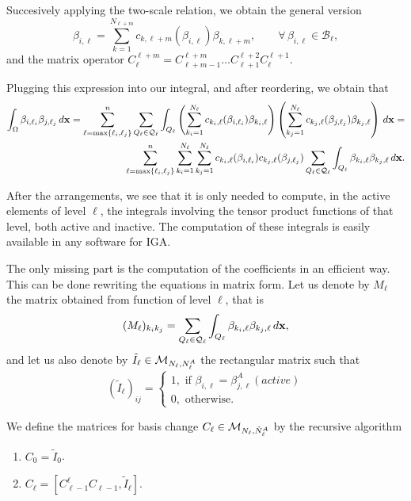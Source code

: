 \documentclass[12pt,a4paper,pdftex]{article}
\theoremstyle{plain}
\theoremstyle{definition}
\theoremstyle{remark}
\newcommand\BB{\mathcal B}
\newcommand\QQ{\mathcal Q}
\newcommand{\bx}{{\bf x}}
\begin{document}
Succesively applying the two-scale relation, we obtain the general version
\begin{equation*}
 \beta_{i,\ell} = \sum_{k=1}^{N_{\ell+m}}
c_{k,\ell+m}(\beta_{i,\ell})\beta_{k,\ell+m}, 
\qquad \forall\,\beta_{i,\ell} \in\BB_\ell,
\end{equation*}
and the matrix operator $C_\ell^{\ell+m} = C_{\ell+m-1}^{\ell+m} \ldots C_{\ell+1}^{\ell+2} C_\ell^{\ell+1}$.

Plugging this expression into our integral, and after reordering, we obtain that 
\begin{align*}
\int_\Omega \beta_{i,\ell_i} \beta_{j,\ell_j} \, d\bx = \sum_{\ell = \max\{\ell_i, \ell_j\}}^n \sum_{Q_\ell \in \QQ_\ell}  \int_{Q_\ell} \left(\sum_{k_i=1}^{N_\ell} c_{k_i,\ell}(\beta_{i,\ell_i}) \beta_{k_i,\ell}\right) \left(\sum_{k_j=1}^{N_\ell} c_{k_j,\ell}(\beta_{j,\ell_j}) \beta_{k_j,\ell}\right) \, d\bx = \\
\sum_{\ell = \max\{\ell_i, \ell_j\}}^n \sum_{k_i=1}^{N_\ell} \sum_{k_j=1}^{N_\ell} c_{k_i,\ell}(\beta_{i,\ell_i}) c_{k_j,\ell}(\beta_{j,\ell_j}) \sum_{Q_\ell \in \QQ_\ell}  \int_{Q_\ell}  \beta_{k_i,\ell}  \beta_{k_j,\ell} \, d\bx.
\end{align*}

After the arrangements, we see that it is only needed to compute, in the active elements of level $\ell$, the integrals involving the tensor product functions of that level, both active and inactive. The computation of these integrals is easily available in any software for IGA. 

The only missing part is the computation of the coefficients in an efficient way. This can be done rewriting the equations in matrix form. Let us denote by $M_\ell$ the matrix obtained from function of level $\ell$, that is
\begin{equation*}
(M_\ell)_{k_i k_j} = \sum_{Q_\ell \in \QQ_\ell}  \int_{Q_\ell}  \beta_{k_i,\ell}  \beta_{k_j,\ell} \, d\bx,
\end{equation*}
and let us also denote by $\tilde I_\ell \in {\cal M}_{N_\ell, N^A_\ell}$ the rectangular matrix such that 
$$
(\tilde I_\ell)_{ij} = \left \{ 
\begin{array}{l}
1, \text{ if }  \beta_{i,\ell} = \beta^A_{j,\ell} (active)\\
0, \text{ otherwise. }
\end{array}
\right.$$

We define the matrices for basis change $C_\ell \in {\cal M}_{N_\ell, \tilde N^A_\ell}$ by the recursive algorithm
\begin{enumerate}
\item $C_0 = \tilde I_0$.
\item $C_\ell = [C_{\ell-1}^\ell C_{\ell-1}, \tilde I_\ell]$.
\end{enumerate}
\end{document}

